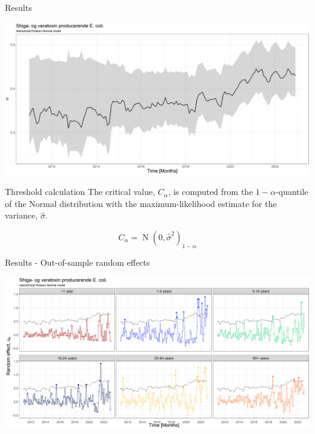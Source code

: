 \documentclass[aspectratio=169]{beamer}
\DeclareMathOperator{\N}{N}
\begin{document}
\begin{frame}{Results}
\protect\hypertarget{results-1}{}
\tiny

\includegraphics[width=1\linewidth]{../figures/phiSTECPoisNExclude}

\normalsize
\end{frame}

\begin{frame}{Threshold calculation}
\protect\hypertarget{threshold-calculation}{}
The critical value, \(C_\alpha\), is computed from the
\(1-\alpha\)-quantile of the Normal distribution with the
maximum-likelihood estimate for the variance, \(\hat\sigma\).

\begin{equation}
  C_\alpha=\N(0,\hat\sigma^2)_{1-\alpha}
\end{equation}
\end{frame}

\begin{frame}{Results - Out-of-sample random effects}
\protect\hypertarget{results---out-of-sample-random-effects}{}
\tiny

\includegraphics[width=1\linewidth]{../figures/windowedSTEDPoisNExclude}

\normalsize
\end{frame}
\end{document}

